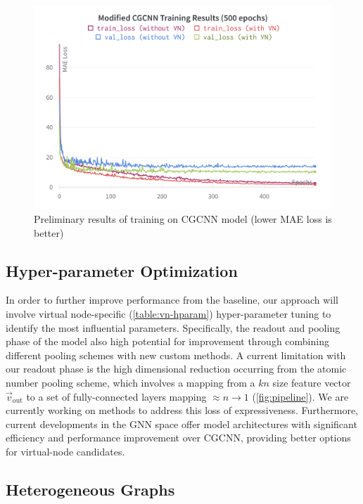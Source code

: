 \documentclass{lxaiproposal}
\begin{document}
\begin{figure}[h]
    \centering
    \includegraphics[width=\linewidth]{result-plots-wandb.png}
    \caption{Preliminary results of training on CGCNN model (lower MAE loss is better)}
    \label{plot:prelim-results}
\end{figure}

\subsection*{Hyper-parameter Optimization}

In order to further improve performance from the baseline, our approach will involve virtual node-specific (\ref{table:vn-hparam}) hyper-parameter tuning to identify the most influential parameters.
Specifically, the readout and pooling phase of the model also high potential for improvement through combining different pooling schemes with new custom methods. A current limitation with our readout phase is the high dimensional reduction occurring from the atomic number pooling scheme, which involves a mapping from a $kn$ size feature vector $\vec v_\text{out}$ to a set of fully-connected layers mapping $\approx n\to 1$ (\ref{fig:pipeline}). We are currently working on methods to address this loss of expressiveness. Furthermore, current developments in the GNN space offer model architectures with significant efficiency and performance improvement over CGCNN, providing better options for virtual-node candidates. 

\subsection*{Heterogeneous Graphs}
\end{document}
